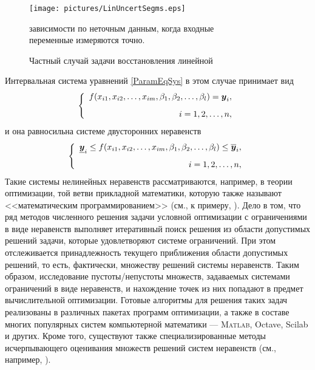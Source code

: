 \documentclass[a5paper,openany]{book}
\newcommand{\mbf}[1]{\protect\text{\boldmath$#1$}}
\newcommand{\ov}{\overline}
\newcommand{\un}{\underline}
\begin{document}
   
\begin{figure}[htb] 
\centering\small  
\texttt{[image: pictures/LinUncertSegms.eps]} 
\caption{Частный случай задачи восстановления линейной} 
         зависимости по неточным данным, когда входные \\
         переменные измеряются точно. 
\label{LinUncSegmsPic} 
\end{figure} 
  
  
Интервальная система уравнений \eqref{ParamEqSys} в этом случае принимает вид 
\begin{equation*} 
\left\{ 
\begin{array}{r} 
f(x_{i1}, x_{i2}, \ldots, x_{im}, 
   \beta_{1}, \beta_{2}, \ldots, \beta_{l}) = \mbf{y}_{i},  \\[3mm] 
i = 1,2,\ldots,n, 
\end{array} 
\right. 
\end{equation*} 
и она равносильна системе двусторонних неравенств 
\begin{equation*} 
\left\{ 
\begin{array}{r} 
\un{\mbf{y}}_{i} \leq f(x_{i1}, x_{i2}, \ldots, x_{im}, 
   \beta_{1}, \beta_{2}, \ldots, \beta_{l}) \leq\ov{\mbf{y}}_{i},  \\[3mm] 
i = 1,2,\ldots,n, 
\end{array} 
\right. 
\end{equation*} 
Такие системы нелинейных неравенств рассматриваются, например, в теории 
оптимизации, той ветви прикладной математики, которую также называют <<математическим 
программированием>> (см., к примеру, \cite{BazaraShetty,ZukhovitskiyAvdeeva,Schrijver}). 
Дело в том, что ряд методов численного решения задачи условной оптимизации с ограничениями 
в виде неравенств выполняет итеративный поиск решения из области допустимых решений задачи, 
которые удовлетворяют системе ограничений. При этом отслеживается принадлежность текущего 
приближения области допустимых решений, то есть, фактически, множеству решений системы 
неравенств. Таким образом, исследование пустоты/непустоты множеств, задаваемых системами 
ограничений в виде неравенств, и нахождение точек из них попадают в предмет вычислительной 
оптимизации. Готовые алгоритмы для решения таких задач реализованы в различных пакетах 
программ оптимизации, а также в составе многих популярных систем компьютерной математики 
--- \textsc{Matlab}, Octave, Scilab и других. Кроме того, существуют также 
специализированные методы исчерпывающего оценивания множеств решений систем 
неравенств (см., например, \cite{EvtuPosypRyTu}). 
  
\end{document}
